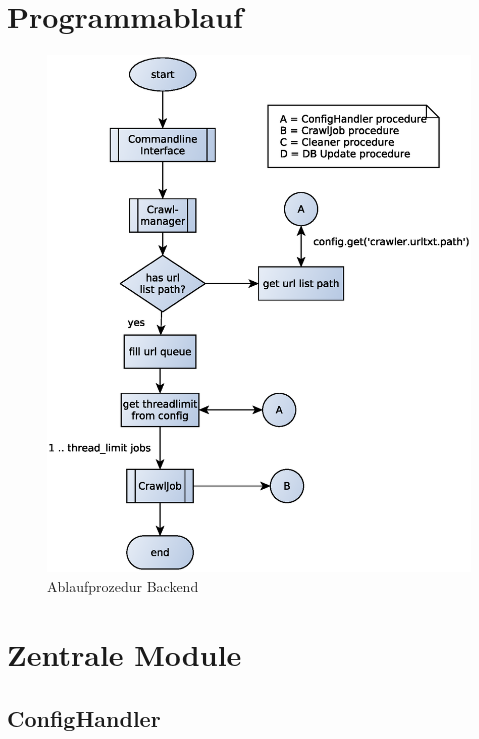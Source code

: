 \section{Programmablauf} 
\label{sec:programmablauf}
\begin{figure}[h]
\centering
\label{dia:design:backend:overview}
\includegraphics[width=\textwidth]{design/backend/gfx/backend_procedure.eps}
\caption{Ablaufprozedur Backend}
\end{figure}



\section{Zentrale Module} 
\label{sec:zentrale_module}

\subsection{ConfigHandler}
\label{sub:confighandler}

